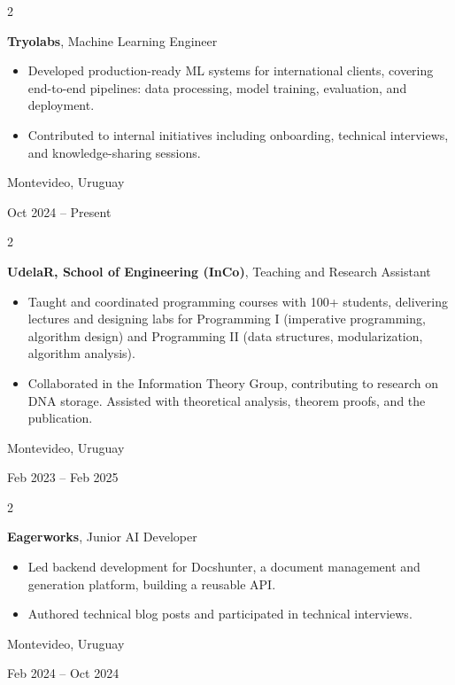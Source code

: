 \documentclass[10pt, letterpaper]{article}
\newenvironment{highlights}{
    \begin{itemize}[
        topsep=0.10 cm,
        parsep=0.10 cm,
        partopsep=0pt,
        itemsep=0pt,
        leftmargin=0.4 cm + 10pt
    ]
}{
    \end{itemize}
} %
\newenvironment{twocolentry}[2][]{
    \onecolentry
    \def\secondColumn{#2}
    \setcolumnwidth{\fill, 4 cm}
    \begin{paracol}{2}
}{
    \switchcolumn \raggedleft \secondColumn
    \end{paracol}
    \endonecolentry
} %
\begin{document}
    \begin{twocolentry}{
        Montevideo, Uruguay

    Oct 2024 -- Present
    }
        \textbf{Tryolabs}, Machine Learning Engineer
        \begin{highlights}
            \item Developed production-ready ML systems for international clients, covering end-to-end pipelines: data processing, model training, evaluation, and deployment.
            \item Contributed to internal initiatives including onboarding, technical interviews, and knowledge-sharing sessions.
        \end{highlights}
    \end{twocolentry}

    \vspace{0.1 cm}

    \begin{twocolentry}{
        Montevideo, Uruguay

    Feb 2023 -- Feb 2025
    }
        \textbf{UdelaR, School of Engineering (InCo)}, Teaching and Research Assistant
        \begin{highlights}
            \item Taught and coordinated programming courses with 100+ students, delivering lectures and designing labs for Programming I (imperative programming, algorithm design) and Programming II (data structures, modularization, algorithm analysis).  
            \item Collaborated in the Information Theory Group, contributing to research on DNA storage. Assisted with theoretical analysis, theorem proofs, and the publication.
        \end{highlights}
    \end{twocolentry}

    \vspace{0.1 cm}

    \begin{twocolentry}{
        Montevideo, Uruguay

    Feb 2024 -- Oct 2024
    }
        \textbf{Eagerworks}, Junior AI Developer
        \begin{highlights}
            \item Led backend development for Docshunter, a document management and generation platform, building a reusable API.
            \item Authored technical blog posts and participated in technical interviews.
        \end{highlights}
    \end{twocolentry}
\end{document}
